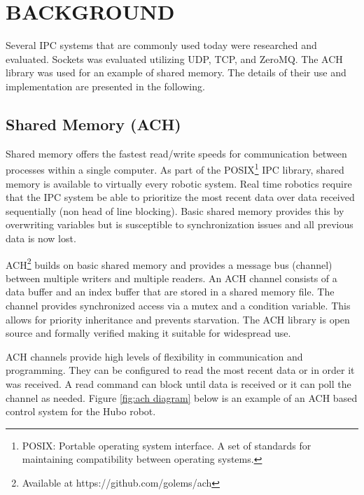 \section{BACKGROUND}

Several IPC systems that are commonly used today were researched and evaluated. Sockets was evaluated utilizing UDP, TCP, and ZeroMQ. The ACH library was used for an example of shared memory. The details of their use and implementation are presented in the following.

\subsection{Shared Memory (ACH)}

Shared memory offers the fastest read/write speeds for communication between processes within a single computer. As part of the POSIX\footnote{POSIX: Portable operating system interface. A set of standards for maintaining compatibility between operating systems.} IPC library, shared memory is available to virtually every robotic system. Real time robotics require that the IPC system be able to prioritize the most recent data over data received sequentially (non head of line blocking)\cite{ACHHUBO, REALTIMEACH, ACHLIBRARY}. Basic shared memory provides this by overwriting variables but is susceptible to synchronization issues and all previous data is now lost\cite{REALTIMEACH}. 

ACH\footnote{Available at https://github.com/golems/ach} builds on basic shared memory and provides a message bus (channel) between multiple writers and multiple readers\cite{ACHLIBRARY}. An ACH channel consists of a data buffer and an index buffer that are stored in a shared memory file. The channel provides synchronized access via a mutex and a condition variable. This allows for priority inheritance and prevents starvation\cite{REALTIMEACH, ACHLIBRARY}. The ACH library is open source and formally verified\cite{REALTIMEACH, ACHHUBO} making it suitable for widespread use.

ACH channels provide high levels of flexibility in communication and programming. They can be configured to read the most recent data or in order it was received\cite{ACHLIBRARY}. A read command can block until data is received or it can poll the channel as needed. Figure \ref{fig:ach diagram} below is an example of an ACH based control system for the Hubo robot. 

